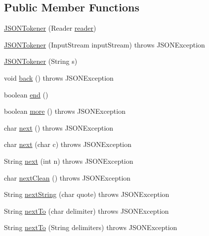 \subsection*{Public Member Functions}
\begin{DoxyCompactItemize}
\item 
\hyperlink{classorg_1_1json_1_1_j_s_o_n_tokener_ab4cd37e4683e88bced2c8e0433bb31b4}{J\-S\-O\-N\-Tokener} (Reader \hyperlink{classorg_1_1json_1_1_j_s_o_n_tokener_a41cf54327cbc4429da0e76ea032d9978}{reader})
\item 
\hyperlink{classorg_1_1json_1_1_j_s_o_n_tokener_a936053c6406cd75b0a7801d6e6de7108}{J\-S\-O\-N\-Tokener} (Input\-Stream input\-Stream)  throws J\-S\-O\-N\-Exception 
\item 
\hyperlink{classorg_1_1json_1_1_j_s_o_n_tokener_ab56cccc925fc2b4042af4b0d3de6a874}{J\-S\-O\-N\-Tokener} (String s)
\item 
void \hyperlink{classorg_1_1json_1_1_j_s_o_n_tokener_aa2eafdef7304777a457f3e66cc0e668b}{back} ()  throws J\-S\-O\-N\-Exception 
\item 
boolean \hyperlink{classorg_1_1json_1_1_j_s_o_n_tokener_a767d3f6c8313e03bc3dfb4fdc495294c}{end} ()
\item 
boolean \hyperlink{classorg_1_1json_1_1_j_s_o_n_tokener_afb0edb7fd38ed9c55470055d46aedd3a}{more} ()  throws J\-S\-O\-N\-Exception 
\item 
char \hyperlink{classorg_1_1json_1_1_j_s_o_n_tokener_ae129753dbe43ea50aa34e3c06773fdfb}{next} ()  throws J\-S\-O\-N\-Exception 
\item 
char \hyperlink{classorg_1_1json_1_1_j_s_o_n_tokener_a3525fe5f3f7767e7130fbe65de1d811e}{next} (char c)  throws J\-S\-O\-N\-Exception 
\item 
String \hyperlink{classorg_1_1json_1_1_j_s_o_n_tokener_a79e7c90c5b0ad4b83113c6df5834d2e8}{next} (int n)  throws J\-S\-O\-N\-Exception 
\item 
char \hyperlink{classorg_1_1json_1_1_j_s_o_n_tokener_ad675aa7419ea153d54a72e1fced1e08f}{next\-Clean} ()  throws J\-S\-O\-N\-Exception 
\item 
String \hyperlink{classorg_1_1json_1_1_j_s_o_n_tokener_af5622e7beb53a5290a7e18f8b8111ee5}{next\-String} (char quote)  throws J\-S\-O\-N\-Exception 
\item 
String \hyperlink{classorg_1_1json_1_1_j_s_o_n_tokener_a6d2f6ecc7488657d6a49ff27861599d4}{next\-To} (char delimiter)  throws J\-S\-O\-N\-Exception 
\item 
String \hyperlink{classorg_1_1json_1_1_j_s_o_n_tokener_a4db4f33d395593dacff7852feb51b9ae}{next\-To} (String delimiters)  throws J\-S\-O\-N\-Exception 

\end{DoxyCompactItemize}
